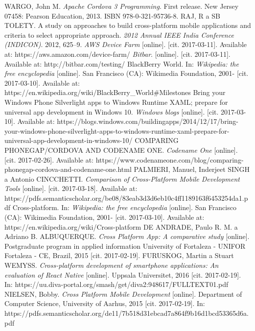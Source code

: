 \documentclass[english,master,public,dept460,male,cpdeclaration,oneside]{diploma}
\begin{document}
\begin{thebibliography}{99}	
	 WARGO, John M. \textit{Apache Cordova 3 Programming}. First release. New Jersey 07458: Pearson Education, 2013. ISBN 978-0-321-95736-8.
	 RAJ, R a SB TOLETY. A study on approaches to build cross-platform mobile applications and criteria to select appropriate approach. \textit{2012 Annual IEEE India Conference (INDICON)}. 2012, 625–9.
	 \textit{AWS Device Farm} [online]. [cit. 2017-03-11]. Available at: https://aws.amazon.com/device-farm/	
	 \textit{Bitbar}. [online]. [cit. 2017-03-11]. Available at: http://bitbar.com/testing/	
	 BlackBerry World. In: \textit{Wikipedia: the free encyclopedia} [online]. San Francisco (CA): Wikimedia Foundation, 2001- [cit. 2017-03-10]. Available at: https://en.wikipedia.org/wiki/BlackBerry\_World\#Milestones
	 Bring your Windows Phone Silverlight apps to Windows Runtime XAML; prepare for universal app development in Windows 10. \textit{Windows blogs} [online]. [cit. 2017-03-10]. Available at: https://blogs.windows.com/buildingapps/2014/12/17/bring-your-windows-phone-silverlight-apps-to-windows-runtime-xaml-prepare-for-universal-app-development-in-windows-10/
	 COMPARING PHONEGAP/CORDOVA AND CODENAME ONE. \textit{Codename One} [online]. [cit. 2017-02-26]. Available at: https://www.codenameone.com/blog/comparing-phonegap-cordova-and-codename-one.html
	 PALMIERI, Manuel, Inderjeet SINGH a Antonio CINCCHETTI. \textit{Comparison of Cross-Platform Mobile Development Tools} [online]. [cit. 2017-03-18]. Available at: https://pdfs.semanticscholar.org/be08/83eab3d3d6eb10c4ff1189163f6453254da1.pdf
	 Cross-platform. In: \textit{Wikipedia: the free encyclopedia} [online]. San Francisco (CA): Wikimedia Foundation, 2001- [cit. 2017-03-10]. Available at: https://en.wikipedia.org/wiki/Cross-platform
	DE ANDRADE, Paulo R. M. a Adriano B. ALBUQUERQUE. \textit{Cross Platform App: A comparative study} [online]. Postgraduate program in applied information University of Fortaleza - UNIFOR Fortaleza - CE, Brazil, 2015 [cit. 2017-02-19].
	 FURUSKOG, Martin a Stuart WEMYSS. \textit{Cross-platform development of smartphone applications: An evaluation of React Native} [online]. Uppsala Universitet, 2016 [cit. 2017-02-19]. In: https://uu.diva-portal.org/smash/get/diva2:948617/FULLTEXT01.pdf
	NIELSEN, Bobby. \textit{Cross Platform Mobile Development} [online]. Department of Computer Science, University of Aarhus, 2015 [cit. 2017-02-19]. In: https://pdfs.semanticscholar.org/de11/7b518d31ebcad7a864f9b16d1bcd53365d6a.pdf

\end{thebibliography}
\end{document}
